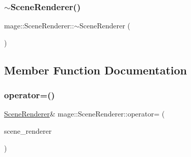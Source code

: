 \hypertarget{classmage_1_1_scene_renderer_a546f45fc7542fa1677d3e9c2014f108e}{}\label{classmage_1_1_scene_renderer_a546f45fc7542fa1677d3e9c2014f108e} 
\subsubsection{\texorpdfstring{$\sim$\+Scene\+Renderer()}{~SceneRenderer()}}
{\footnotesize\ttfamily mage\+::\+Scene\+Renderer\+::$\sim$\+Scene\+Renderer (\begin{DoxyParamCaption}{ }\end{DoxyParamCaption})\hspace{0.3cm}{\ttfamily [default]}}



\subsection{Member Function Documentation}
\hypertarget{classmage_1_1_scene_renderer_a5b63908f5bdfe6128b43847db01db983}{}\label{classmage_1_1_scene_renderer_a5b63908f5bdfe6128b43847db01db983} 
\subsubsection{\texorpdfstring{operator=()}{operator=()}\hspace{0.1cm}{\footnotesize\ttfamily [1/2]}}
{\footnotesize\ttfamily \hyperlink{classmage_1_1_scene_renderer}{Scene\+Renderer}\& mage\+::\+Scene\+Renderer\+::operator= (\begin{DoxyParamCaption}\item[{const \hyperlink{classmage_1_1_scene_renderer}{Scene\+Renderer} \&}]{scene\+\_\+renderer }\end{DoxyParamCaption})\hspace{0.3cm}{\ttfamily [delete]}}

\hypertarget{classmage_1_1_scene_renderer_af64b01e57b0367a285f48e1f34f291e3}{}\label{classmage_1_1_scene_renderer_af64b01e57b0367a285f48e1f34f291e3} 

